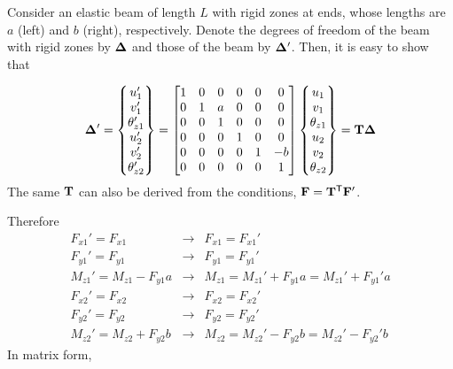 \begin{example}
Consider an elastic beam of length $L$ with rigid zones at ends, whose lengths are $a$ (left) and $b$ (right), respectively. Denote the degrees of freedom of the beam with rigid zones by $\bm{\Delta}$ and those of the beam by $\bm{\Delta}'$. Then, it is easy to show that
\begin{fig}
  
\end{fig}
\begin{equation*}
  \bm{\Delta}' = \begin{Bmatrix}u_1'\\ v_1'\\ \theta_{z1}'\\ u_2'\\ v_2'\\ \theta_{z2}'\end{Bmatrix} =
  \begin{bmatrix}1 & 0 & 0 & 0 & 0 & 0\\ 0 & 1 & a & 0 & 0 & 0\\ 0 & 0 & 1 & 0 & 0 & 0\\ 0 & 0 & 0 & 1 & 0 & 0\\ 0 & 0 & 0 & 0 & 1 & -b\\ 0 & 0 & 0 & 0 & 0 & 1\end{bmatrix}
  \begin{Bmatrix}u_1\\ v_1\\ \theta_{z1}\\ u_2\\ v_2\\ \theta_{z2}\end{Bmatrix} = \mathbf{T}\bm{\Delta}
\end{equation*}
The same $\mathbf{T}$ can also be derived from the conditions, $\mathbf{F} = \mathbf{T}^{\mathsf{T}}\mathbf{F}'$.
\begin{fig}
  
\end{fig}
Therefore
\begin{equation*}
  \begin{array}{lcl}
    F_{x1}' = F_{x1} & \rightarrow & F_{x1} = F_{x1}'\\
    F_{y1}' = F_{y1} & \rightarrow & F_{y1} = F_{y1}'\\
    M_{z1}' = M_{z1} - F_{y1}a & \rightarrow & M_{z1} = M_{z1}' + F_{y1}a = M_{z1}' + F_{y1}'a\\
    F_{x2}' = F_{x2} & \rightarrow & F_{x2} = F_{x2}'\\
    F_{y2}' = F_{y2} & \rightarrow & F_{y2} = F_{y2}'\\
    M_{z2}' = M_{z2} + F_{y2}b & \rightarrow & M_{z2} = M_{z2}' - F_{y2}b = M_{z2}' - F_{y2}'b
  \end{array}
\end{equation*}
In matrix form,
\begin{equation*}

\end{equation*}
\end{example}
